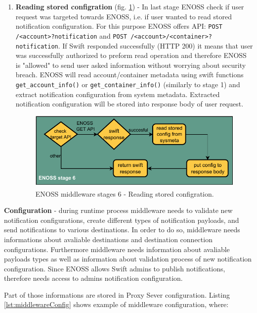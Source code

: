\begin{enumerate}
        \item \textbf{Reading stored configration} (fig. \ref{fig:enoss-stage6}) - In last stage ENOSS check if user request was targeted towards ENOSS, i.e. if user wanted to read stored notification configuration. For this purpose ENOSS offers API: \texttt{POST /<account>?notification} and \texttt{POST /<account>/<container>?notification}. If Swift responded successfully (HTTP 200) it means that user was successfully authorized to preform read operation and therefore ENOSS is "allowed" to send user asked information without worrying about security breach. ENOSS will read account/container metadata using swift functions \texttt{get\_account\_info()} or \texttt{get\_container\_info()} (similarly to stage 1) and extract notification configuration from system metadata. Extracted notification configuration will be stored into response body of user request.

        \begin{figure}[H]
            \centering
            \includegraphics[width=1\textwidth]{obrazky-figures/enoss-stage6.pdf}
            \caption{ENOSS middleware stages 6 - Reading stored configration.}
            \label{fig:enoss-stage6}
        \end{figure}
    \end{enumerate}

    \textbf{Configuration} - during runtime process middleware needs to validate new notification configurations, create different types of notification payloads, and send notifications to various destinations. In order to do so, middleware needs informations about avaliable destinations and destination connection configurations. Furthermore middleware needs information about avaliable payloads types as well as information about validation process of new notification configuration. Since ENOSS allows Swift admins to publish notifications, therefore needs access to admins notification configuration.

    Part of those informations are stored in Proxy Sever configuration. Listing \ref{lst:middlewareConfig} shows example of middleware configuration, where:

